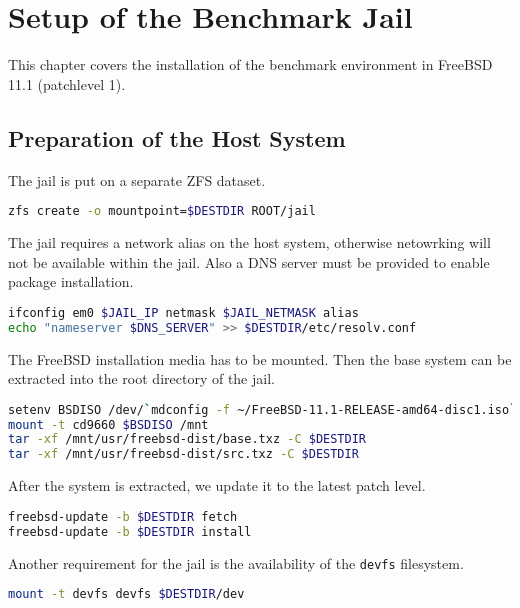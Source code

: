 \chapter{Setup of the Benchmark Jail}
\label{jail-setup}

This chapter covers the installation of the benchmark environment in FreeBSD 11.1 (patchlevel 1).

\section*{Preparation of the Host System}

The jail is put on a separate ZFS dataset.

\begin{lstlisting}[language=bash]
zfs create -o mountpoint=$DESTDIR ROOT/jail 
\end{lstlisting}

The jail requires a network alias on the host system, otherwise netowrking will not be available within the jail.
Also a DNS server must be provided to enable package installation.

\begin{lstlisting}[language=bash]
ifconfig em0 $JAIL_IP netmask $JAIL_NETMASK alias
echo "nameserver $DNS_SERVER" >> $DESTDIR/etc/resolv.conf
\end{lstlisting}

The FreeBSD installation media has to be mounted. Then the base system can be extracted into the root directory of the jail.

\begin{lstlisting}[language=bash]
setenv BSDISO /dev/`mdconfig -f ~/FreeBSD-11.1-RELEASE-amd64-disc1.iso`
mount -t cd9660 $BSDISO /mnt
tar -xf /mnt/usr/freebsd-dist/base.txz -C $DESTDIR
tar -xf /mnt/usr/freebsd-dist/src.txz -C $DESTDIR
\end{lstlisting}

After the system is extracted, we update it to the latest patch level.

\begin{lstlisting}[language=bash]
freebsd-update -b $DESTDIR fetch
freebsd-update -b $DESTDIR install
\end{lstlisting}

Another requirement for the jail is the availability of the \texttt{devfs} filesystem.

\begin{lstlisting}[language=bash]
mount -t devfs devfs $DESTDIR/dev
\end{lstlisting}


